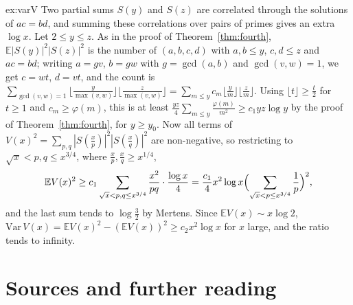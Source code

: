 \begin{solution}{ex:varV}
\idea Two partial sums $S(y)$ and $S(z)$ are correlated through the solutions of $ac=bd$, and summing these correlations over pairs of primes gives an extra $\log x$.
\writeup Let $2\le y\le z$. As in the proof of Theorem~\ref{thm:fourth}, $\mathbb E|S(y)|^2|S(z)|^2$ is the number of $(a,b,c,d)$ with $a,b\le y$, $c,d\le z$ and $ac=bd$; writing $a=gv$, $b=gw$ with $g=\gcd(a,b)$ and $\gcd(v,w)=1$, we get $c=wt$, $d=vt$, and the count is $\sum_{\gcd(v,w)=1}\lfloor\frac y{\max(v,w)}\rfloor\lfloor\frac z{\max(v,w)}\rfloor=\sum_{m\le y}c_m\lfloor\frac ym\rfloor\lfloor\frac zm\rfloor$. Using $\lfloor t\rfloor\ge\frac t2$ for $t\ge1$ and $c_m\ge\varphi(m)$, this is at least $\frac{yz}4\sum_{m\le y}\frac{\varphi(m)}{m^2}\ge c_1yz\log y$ by the proof of Theorem~\ref{thm:fourth}, for $y\ge y_0$. Now all terms of $V(x)^2=\sum_{p,q}|S(\frac xp)|^2|S(\frac xq)|^2$ are non-negative, so restricting to $\sqrt x<p,q\le x^{3/4}$, where $\frac xp,\frac xq\ge x^{1/4}$,
\[
\mathbb EV(x)^2\ge c_1\sum_{\sqrt x<p,q\le x^{3/4}}\frac{x^2}{pq}\cdot\frac{\log x}4=\frac{c_1}4x^2\log x\Bigl(\sum_{\sqrt x<p\le x^{3/4}}\frac1p\Bigr)^2,
\]
and the last sum tends to $\log\frac32$ by Mertens. Since $\mathbb EV(x)\sim x\log2$, $\mathrm{Var}\,V(x)=\mathbb EV(x)^2-(\mathbb EV(x))^2\ge c_2x^2\log x$ for $x$ large, and the ratio tends to infinity.
\end{solution}

\section*{Sources and further reading}


